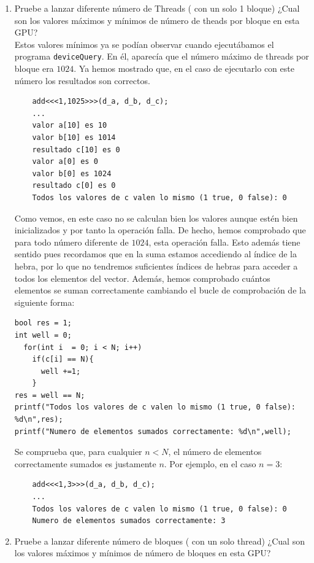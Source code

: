 \documentclass[11pt]{article}
\def\inline{\lstinline[basicstyle=\ttfamily,keywordstyle={}]}
\theoremstyle{plain}
\begin{document}
\begin{enumerate}

\item Pruebe a lanzar diferente número de Threads ( con un solo 1 bloque)
  ¿Cual son los valores máximos y mínimos de número de theads por bloque en esta GPU?\\

  Estos valores mínimos ya se podían observar cuando ejecutábamos el programa \inline{deviceQuery}. En él, aparecía que el número máximo de threads por bloque era $1024$. Ya hemos mostrado que, en el caso de ejecutarlo con este número los resultados son correctos.

  \begin{verbatim}
	add<<<1,1025>>>(d_a, d_b, d_c);
	... 
	valor a[10] es 10
 	valor b[10] es 1014
	resultado c[10] es 0
 	valor a[0] es 0
 	valor b[0] es 1024
	resultado c[0] es 0
	Todos los valores de c valen lo mismo (1 true, 0 false): 0
  \end{verbatim}
Como vemos, en este caso no se calculan bien los valores aunque estén bien inicializados y por tanto la operación falla. De hecho, hemos comprobado que para todo número diferente de $1024$, esta operación falla. Esto además tiene sentido pues recordamos que en la suma estamos accediendo al índice de la hebra, por lo que no tendremos suficientes índices de hebras para acceder a todos los elementos del vector. Además, hemos comprobado cuántos elementos se suman correctamente cambiando el bucle de comprobación de la siguiente forma:
\begin{verbatim}
bool res = 1;
int well = 0;
  for(int i  = 0; i < N; i++)
    if(c[i] == N){
      well +=1;
    }
res = well == N;
printf("Todos los valores de c valen lo mismo (1 true, 0 false): %d\n",res);
printf("Numero de elementos sumados correctamente: %d\n",well);
\end{verbatim}
Se comprueba que, para cualquier $n < N$, el número de elementos correctamente sumados es justamente $n$. Por ejemplo, en el caso $n=3$:
\begin{verbatim}
	add<<<1,3>>>(d_a, d_b, d_c);
	... 
   	Todos los valores de c valen lo mismo (1 true, 0 false): 0
   	Numero de elementos sumados correctamente: 3
\end{verbatim} 
\item Pruebe a lanzar diferente número de bloques ( con un solo thread) ¿Cual son los valores máximos y mínimos de número de bloques en esta GPU?
\end{enumerate}
\end{document}
